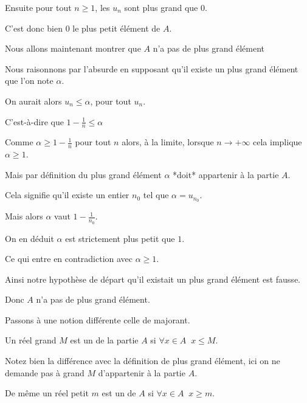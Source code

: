 \change
Ensuite pour tout $n\ge 1$, les $u_n$ sont plus grand que $0$. 

C'est donc bien $0$ le plus petit élément de $A$.

\change


Nous allons maintenant montrer que $A$ n'a pas de plus grand élément 

\change

Nous raisonnons par l'absurde en supposant qu'il existe un plus grand élément que l'on note $\alpha$.

\change


On aurait alors $u_n \le \alpha$, pour tout $u_n$.

C'est-à-dire que $1-\frac{1}{n} \le \alpha$ 

\change 

Comme $\alpha \ge 1-\frac{1}{n}$ pour tout $n$ alors, 
à la limite, lorsque $n \to +\infty$ cela implique $\alpha \ge 1$.

\change

Mais par définition du plus grand élément $\alpha$ *doit* appartenir à la partie $A$.

\change

Cela signifie qu'il existe un entier $n_0$ tel que $\alpha = u_{n_0}$. 

\change

Mais alors $\alpha$ vaut $1-\frac{1}{n_0}$. 

On en déduit $\alpha$ est strictement plus petit que $1$.

\change

Ce qui entre en contradiction avec $\alpha \ge 1$. 

Ainsi notre hypothèse de départ qu'il existait un plus grand élément est fausse.

Donc $A$ n'a pas de plus grand élément.


\diapo

Passons à une notion différente celle de majorant.

 Un réel grand $M$ est un  de la partie $A$ si $\forall x \in A \;\; x\leq M$. 

Notez bien la différence avec la définition de plus grand élément, ici on ne demande pas à grand $M$
d'appartenir à la partie $A$.

\change

De même un réel petit $m$ est un  de $A$ si $\forall x \in A \;\; x\geq m$.

